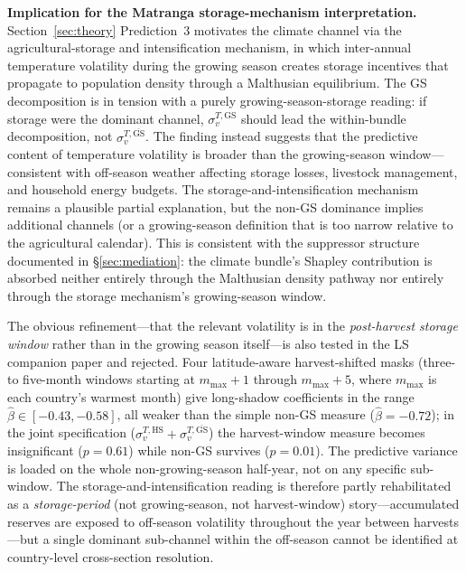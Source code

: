 \documentclass[11pt,letterpaper]{article}
\begin{document}
\textbf{Implication for the Matranga storage-mechanism interpretation.} Section~\ref{sec:theory} Prediction~3 motivates the climate channel via the \citet{matranga2024} agricultural-storage and intensification mechanism, in which inter-annual temperature volatility during the growing season creates storage incentives that propagate to population density through a Malthusian equilibrium. The GS decomposition is in tension with a purely growing-season-storage reading: if storage were the dominant channel, $\sigma_v^{T,\mathrm{GS}}$ should lead the within-bundle decomposition, not $\sigma_v^{T,\overline{\mathrm{GS}}}$. The finding instead suggests that the predictive content of temperature volatility is broader than the growing-season window---consistent with off-season weather affecting storage losses, livestock management, and household energy budgets. The storage-and-intensification mechanism remains a plausible partial explanation, but the non-GS dominance implies additional channels (or a growing-season definition that is too narrow relative to the agricultural calendar). This is consistent with the suppressor structure documented in \S\ref{sec:mediation}: the climate bundle's Shapley contribution is absorbed neither entirely through the Malthusian density pathway nor entirely through the storage mechanism's growing-season window.

The obvious refinement---that the relevant volatility is in the \emph{post-harvest storage window} rather than in the growing season itself---is also tested in the LS companion paper \citep{alonso_long_shadow} and rejected. Four latitude-aware harvest-shifted masks (three- to five-month windows starting at $m_{\max}{+}1$ through $m_{\max}{+}5$, where $m_{\max}$ is each country's warmest month) give long-shadow coefficients in the range $\hat\beta \in [-0.43, -0.58]$, all weaker than the simple non-GS measure ($\hat\beta = -0.72$); in the joint specification ($\sigma_v^{T,\mathrm{HS}} + \sigma_v^{T,\overline{\mathrm{GS}}}$) the harvest-window measure becomes insignificant ($p = 0.61$) while non-GS survives ($p = 0.01$). The predictive variance is loaded on the whole non-growing-season half-year, not on any specific sub-window. The storage-and-intensification reading is therefore partly rehabilitated as a \emph{storage-period} (not growing-season, not harvest-window) story---accumulated reserves are exposed to off-season volatility throughout the year between harvests---but a single dominant sub-channel within the off-season cannot be identified at country-level cross-section resolution.
\end{document}
